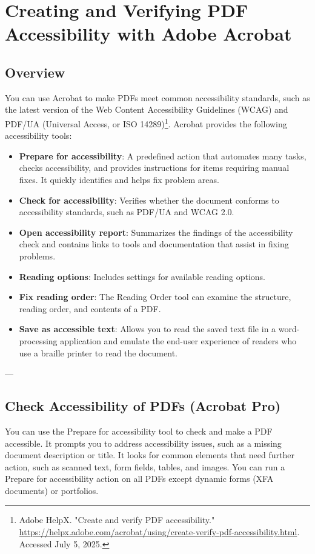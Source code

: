 \chapter{Creating and Verifying PDF Accessibility with Adobe Acrobat}

\section*{Overview}
You can use Acrobat to make PDFs meet common accessibility standards, such as the latest version of the Web Content Accessibility Guidelines (WCAG) and PDF/UA (Universal Access, or ISO 14289)\footnote{Adobe HelpX. "Create and verify PDF accessibility." \url{https://helpx.adobe.com/acrobat/using/create-verify-pdf-accessibility.html}. Accessed July 5, 2025.}. Acrobat provides the following accessibility tools:
\begin{itemize}
    \item \textbf{Prepare for accessibility}: A predefined action that automates many tasks, checks accessibility, and provides instructions for items requiring manual fixes. It quickly identifies and helps fix problem areas.
    \item \textbf{Check for accessibility}: Verifies whether the document conforms to accessibility standards, such as PDF/UA and WCAG 2.0.
    \item \textbf{Open accessibility report}: Summarizes the findings of the accessibility check and contains links to tools and documentation that assist in fixing problems.
    \item \textbf{Reading options}: Includes settings for available reading options.
    \item \textbf{Fix reading order}: The Reading Order tool can examine the structure, reading order, and contents of a PDF.
    \item \textbf{Save as accessible text}: Allows you to read the saved text file in a word-processing application and emulate the end-user experience of readers who use a braille printer to read the document.
\end{itemize}

---

\section*{Check Accessibility of PDFs (Acrobat Pro)}
You can use the Prepare for accessibility tool to check and make a PDF accessible. It prompts you to address accessibility issues, such as a missing document description or title. It looks for common elements that need further action, such as scanned text, form fields, tables, and images. You can run a Prepare for accessibility action on all PDFs except dynamic forms (XFA documents) or portfolios\footnotemark[1].

